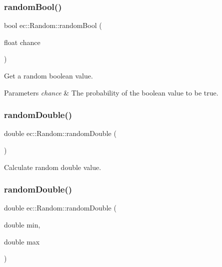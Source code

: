 \subsubsection{\texorpdfstring{random\+Bool()}{randomBool()}}
{\footnotesize\ttfamily bool ec\+::\+Random\+::random\+Bool (\begin{DoxyParamCaption}\item[{float}]{chance }\end{DoxyParamCaption})\hspace{0.3cm}{\ttfamily [static]}}

Get a random boolean value. 
\begin{DoxyParams}{Parameters}
{\em chance} & The probability of the boolean value to be true. \\
\hline
\end{DoxyParams}
\mbox{\label{classec_1_1_random_a121adac4b6557b213e059b1e15bad496}} 
\subsubsection{\texorpdfstring{random\+Double()}{randomDouble()}\hspace{0.1cm}{\footnotesize\ttfamily [1/2]}}
{\footnotesize\ttfamily double ec\+::\+Random\+::random\+Double (\begin{DoxyParamCaption}{ }\end{DoxyParamCaption})\hspace{0.3cm}{\ttfamily [static]}}

Calculate random double value. \mbox{\label{classec_1_1_random_a5b7ce52c95262159a19684eed32d2648}} 
\subsubsection{\texorpdfstring{random\+Double()}{randomDouble()}\hspace{0.1cm}{\footnotesize\ttfamily [2/2]}}
{\footnotesize\ttfamily double ec\+::\+Random\+::random\+Double (\begin{DoxyParamCaption}\item[{double}]{min,  }\item[{double}]{max }\end{DoxyParamCaption})\hspace{0.3cm}{\ttfamily [static]}}

